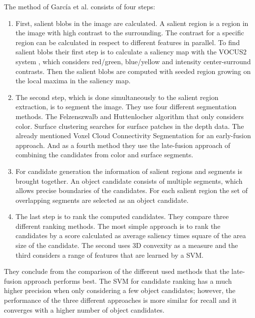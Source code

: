 \documentclass[a4paper,11pt,english]{article}
\begin{document}
The method of García et al. consists of four steps:

\begin{enumerate}
	\item First, salient blobs in the image are calculated.
	A salient region is a region in the image with high contrast to the surrounding.
	The contrast for a specific region can be calculated in respect to different features in parallel.
	To find salient blobs their first step is to calculate a saliency map with the VOCUS2 system \cite{frintrop2015traditional}, which considers red/green, blue/yellow and intensity center-surround contrasts.
	Then the salient blobs are computed with seeded region growing on the local maxima in the saliency map.
	\item The second step, which is done simultaneously to the salient region extraction, is to segment the image.
	They use four different segmentation methods. The Felzenszwalb and Huttenlocher algorithm \cite{felzenszwalb2004efficient} that only considers color. Surface clustering searches for surface patches in the depth data. The already mentioned Voxel Cloud Connectivity Segmentation for an early-fusion approach. And as a fourth method they use the late-fusion approach of combining the candidates from color and surface segments.
	\item For candidate generation the information of salient regions and segments is brought together.
	An object candidate consists of multiple segments, which allows precise boundaries of the candidates.
	For each salient region the set of overlapping segments are selected as an object candidate.
	\item The last step is to rank the computed candidates. They compare three different ranking methods.
	The most simple approach is to rank the candidates by a score calculated as average saliency times square of the area size of the candidate.
	The second uses 3D convexity as a measure and the third considers a range of features that are learned by a SVM.
\end{enumerate}

They conclude from the comparison of the different used methods that the late-fusion approach performs best.
The SVM for candidate ranking has a much higher precision when only considering a few object candidates; however, the performance of the three different approaches is more similar for recall and it converges with a higher number of object candidates.
\end{document}
